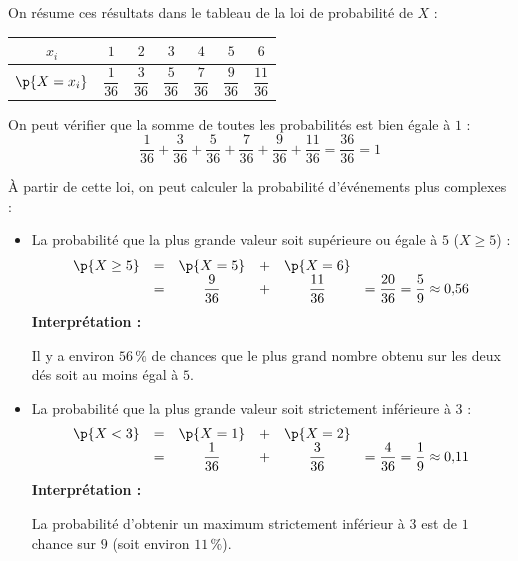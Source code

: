 \begin{methode}
\begin{correction}
		On résume ces résultats dans le tableau de la loi de probabilité de $X$ :

		\begin{center}
			\begin{tabular}{|c|c|c|c|c|c|c|} \hline
				\ccg $x_i$                             & $1$             & $2$             & $3$             & $4$             & $5$             & $6$              \\ \hline
				\rule[-4mm]{0mm}{11mm}\ccg $\p{X=x_i}$ & $\dfrac{1}{36}$ & $\dfrac{3}{36}$ & $\dfrac{5}{36}$ & $\dfrac{7}{36}$ & $\dfrac{9}{36}$ & $\dfrac{11}{36}$ \\ \hline
			\end{tabular}
		\end{center}
	\end{correction}

	On peut vérifier que la somme de toutes les probabilités est bien égale à $1$ :
	\[
		\dfrac{1}{36} + \dfrac{3}{36} + \dfrac{5}{36} + \dfrac{7}{36} + \dfrac{9}{36} + \dfrac{11}{36} = \dfrac{36}{36} = 1
	\]

	À partir de cette loi, on peut calculer la probabilité d'événements plus complexes :

	\begin{itemize}
		\item La probabilité que la plus grande valeur soit supérieure ou égale à $5$ ($X \ge 5$) :
		      \[
			      \begin{array}{rccccl}
				      \p{X \ge 5} & = & \p{X=5}       & + & \p{X=6}        &                                                \\
				                  & = & \dfrac{9}{36} & + & \dfrac{11}{36} & = \dfrac{20}{36} = \dfrac{5}{9} \approx 0{,}56
			      \end{array}
		      \]
		      \textbf{Interprétation :} 

			  Il y a environ $56\,\%$ de chances que le plus grand nombre obtenu sur les deux dés soit au moins égal à $5$.

		\item La probabilité que la plus grande valeur soit strictement inférieure à $3$ :
		      \[
			      \begin{array}{rccccl}
				      \p{X < 3} & = & \p{X=1}       & + & \p{X=2}       &                                               \\
				                & = & \dfrac{1}{36} & + & \dfrac{3}{36} & = \dfrac{4}{36} = \dfrac{1}{9} \approx 0{,}11
			      \end{array}
		      \]
		      \textbf{Interprétation :}

			  La probabilité d'obtenir un maximum strictement inférieur à $3$ est de $1$ chance sur $9$ (soit environ $11\,\%$).
	\end{itemize}
\end{methode}

